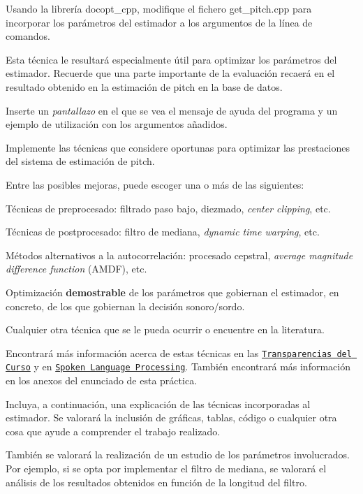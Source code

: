 \begin{DoxyItemize}
\item Usando la librería {\ttfamily docopt\+\_\+cpp}, modifique el fichero {\ttfamily get\+\_\+pitch.\+cpp} para incorporar los parámetros del estimador a los argumentos de la línea de comandos.

Esta técnica le resultará especialmente útil para optimizar los parámetros del estimador. Recuerde que una parte importante de la evaluación recaerá en el resultado obtenido en la estimación de pitch en la base de datos.
\begin{DoxyItemize}
\item Inserte un {\itshape pantallazo} en el que se vea el mensaje de ayuda del programa y un ejemplo de utilización con los argumentos añadidos.
\end{DoxyItemize}
\item Implemente las técnicas que considere oportunas para optimizar las prestaciones del sistema de estimación de pitch.

Entre las posibles mejoras, puede escoger una o más de las siguientes\+:
\begin{DoxyItemize}
\item Técnicas de preprocesado\+: filtrado paso bajo, diezmado, {\itshape center clipping}, etc.
\item Técnicas de postprocesado\+: filtro de mediana, {\itshape dynamic time warping}, etc.
\item Métodos alternativos a la autocorrelación\+: procesado cepstral, {\itshape average magnitude difference function} (A\+M\+DF), etc.
\item Optimización {\bfseries demostrable} de los parámetros que gobiernan el estimador, en concreto, de los que gobiernan la decisión sonoro/sordo.
\item Cualquier otra técnica que se le pueda ocurrir o encuentre en la literatura.
\end{DoxyItemize}

Encontrará más información acerca de estas técnicas en las \href{https://atenea.upc.edu/pluginfile.php/2908770/mod_resource/content/3/2b_PS%20Techniques.pdf}{\tt Transparencias del Curso} y en \href{https://discovery.upc.edu/iii/encore/record/C__Rb1233593?lang=cat}{\tt Spoken Language Processing}. También encontrará más información en los anexos del enunciado de esta práctica.

Incluya, a continuación, una explicación de las técnicas incorporadas al estimador. Se valorará la inclusión de gráficas, tablas, código o cualquier otra cosa que ayude a comprender el trabajo realizado.

También se valorará la realización de un estudio de los parámetros involucrados. Por ejemplo, si se opta por implementar el filtro de mediana, se valorará el análisis de los resultados obtenidos en función de la longitud del filtro.
\end{DoxyItemize}

